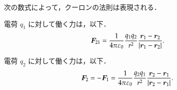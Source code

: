             次の数式によって，クーロンの法則は表現される．

            電荷 $q_{1}$ に対して働く力は，以下．
               \begin{align}\label{eq:coulomb_force_f1_2nd}
                   \bF_{21} =
                       \frac{1}{4\pi\varepsilon_{0}} \frac{q_{1}q_{2}}{r^{2}}
                           \frac{\br_{1} - \br_{2}}{|\br_{1} - \br_{2}|}.
               \end{align}

            電荷 $q_{2}$ に対して働く力は，以下．
               \begin{align}
                   \boldsymbol{F}_{2} = -\boldsymbol{F}_{1} =
                       \frac{1}{4\pi\varepsilon_{0}} \frac{q_{2}q_{1}}{r^{2}}
                           \frac{\boldsymbol{r}_{2} - \boldsymbol{r}_{1}}{|\boldsymbol{r}_{2} - \boldsymbol{r}_{1}|}.
               \end{align}


        \begin{figure}[hbt]
            \begin{center}
            \end{center}
        \end{figure}


